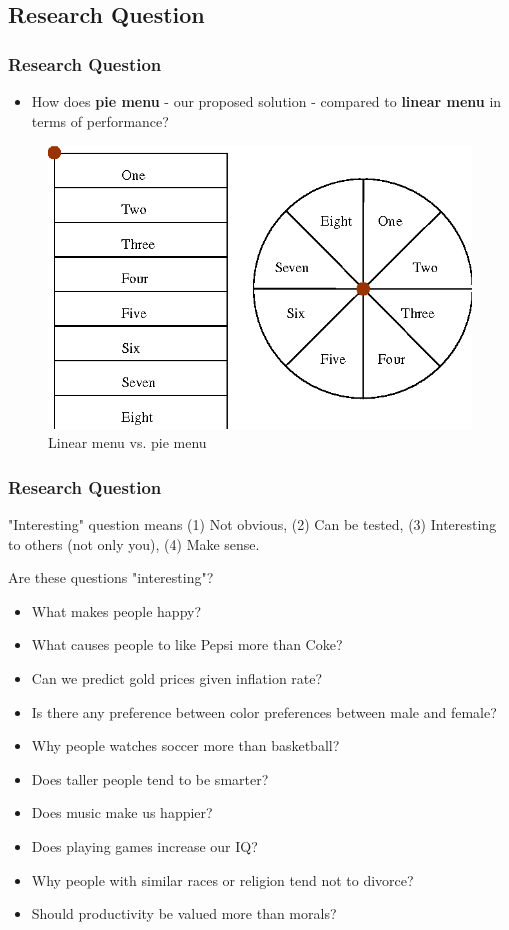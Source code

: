 \documentclass{beamer}
\begin{document}
\subsection{Research Question}

\begin{frame}
	\frametitle{Research Question}
	\begin{itemize}
		\item  How does \textbf{pie menu} - our proposed solution - compared to \textbf{linear menu} in terms of performance?
	\end{itemize}
	\begin{figure}
		\includegraphics[width=0.6\linewidth]{pie}
		\caption{Linear menu vs. pie menu}
	\end{figure}
\end{frame}



\begin{frame}
	\footnotesize
	\frametitle{Research Question}
	"Interesting" question means (1) Not obvious, (2) Can be tested, (3) Interesting to others (not only you), (4) Make sense.
	
	\medskip	

	Are these questions "interesting"?
	\begin{itemize}
		\item What makes people happy?
		\item What causes people to like Pepsi more than Coke?
		\item Can we predict gold prices given inflation rate?
		\item Is there any preference between color preferences between male and female?
		\item Why people watches soccer more than basketball?
		\item Does taller people tend to be smarter?
		\item Does music make us happier?
		\item Does playing games increase our IQ?
		\item Why people with similar races or religion tend not to divorce?
		\item Should productivity be valued more than morals?
	\end{itemize}

\end{frame}
\end{document}
